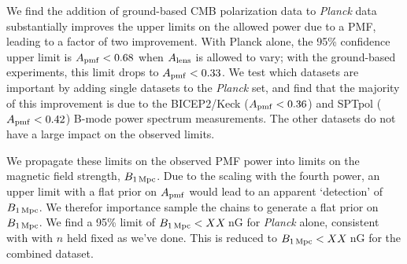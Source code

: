 \documentclass[preprint]{emulateapj}
\newcommand{\apmf}{\ensuremath{A_{\rm pmf}}}
\newcommand{\bpmf}{\ensuremath{B_{\rm 1\,Mpc}}}
\newcommand{\alens}{\ensuremath{A_{\rm lens}}}
\newcommand{\planck}{{\sl Planck}}
\newcommand{\bicepkeck}{BICEP2/Keck}
\newcommand{\sptpol}{SPTpol}
\begin{document}
We find the addition of ground-based CMB polarization data to \planck{} data substantially improves the upper limits on the allowed power due to a PMF, leading to a factor of two improvement. 
With Planck alone, the 95\% confidence upper limit is $\apmf <  0.68$ when $\alens$ is allowed to vary; with the ground-based experiments, this limit drops to $\apmf <  0.33$. 
We test which datasets are important by adding single datasets to the \planck{} set, and find that the majority of this improvement is due to the \bicepkeck{} ($\apmf <  0.36$) and \sptpol{} ($\apmf <  0.42$) B-mode power spectrum measurements. 
The other datasets do not have a large impact on the observed limits. 

We propagate these limits on the observed PMF power into limits on the magnetic field strength, \bpmf. 
Due to the scaling with the fourth power, an upper limit with a flat prior on \apmf{} would lead to an apparent `detection' of \bpmf. 
We therefor importance sample the chains to generate a flat prior on \bpmf. 
We find a 95\% limit of $\bpmf < XX$\,nG for \planck{} alone, consistent with \citep{planck15-19} with $n$ held fixed as we've done. 
This is reduced to $\bpmf < XX$\,nG for the combined dataset. 
\end{document}
